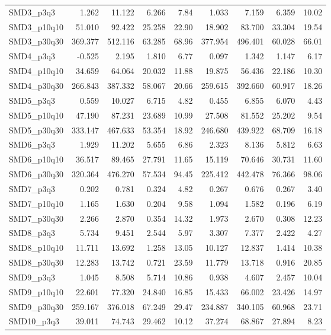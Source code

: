 \begin{longtable}{lrrrrrrrr}
SMD3\_p3q3 & 1.262 & 11.122 & 6.266 & 7.84 & 1.033 & 7.159 & 6.359 & 10.02 \\
SMD3\_p10q10 & 51.010 & 92.422 & 25.258 & 22.90 & 18.902 & 83.700 & 33.304 & 19.54 \\
SMD3\_p30q30 & 369.377 & 512.116 & 63.285 & 68.96 & 377.954 & 496.401 & 60.028 & 66.01 \\
SMD4\_p3q3 & -0.525 & 2.195 & 1.810 & 6.77 & 0.097 & 1.342 & 1.147 & 6.17 \\
SMD4\_p10q10 & 34.659 & 64.064 & 20.032 & 11.88 & 19.875 & 56.436 & 22.186 & 10.30 \\
SMD4\_p30q30 & 266.843 & 387.332 & 58.067 & 20.66 & 259.615 & 392.660 & 60.917 & 18.26 \\
SMD5\_p3q3 & 0.559 & 10.027 & 6.715 & 4.82 & 0.455 & 6.855 & 6.070 & 4.43 \\
SMD5\_p10q10 & 47.190 & 87.231 & 23.689 & 10.99 & 27.508 & 81.552 & 25.202 & 9.54 \\
SMD5\_p30q30 & 333.147 & 467.633 & 53.354 & 18.92 & 246.680 & 439.922 & 68.709 & 16.18 \\
SMD6\_p3q3 & 1.929 & 11.202 & 5.655 & 6.86 & 2.323 & 8.136 & 5.812 & 6.63 \\
SMD6\_p10q10 & 36.517 & 89.465 & 27.791 & 11.65 & 15.119 & 70.646 & 30.731 & 11.60 \\
SMD6\_p30q30 & 320.364 & 476.270 & 57.534 & 94.45 & 225.412 & 442.478 & 76.366 & 98.06 \\
SMD7\_p3q3 & 0.202 & 0.781 & 0.324 & 4.82 & 0.267 & 0.676 & 0.267 & 3.40 \\
SMD7\_p10q10 & 1.165 & 1.630 & 0.204 & 9.58 & 1.094 & 1.582 & 0.196 & 6.19 \\
SMD7\_p30q30 & 2.266 & 2.870 & 0.354 & 14.32 & 1.973 & 2.670 & 0.308 & 12.23 \\
SMD8\_p3q3 & 5.734 & 9.451 & 2.544 & 5.97 & 3.307 & 7.377 & 2.422 & 4.27 \\
SMD8\_p10q10 & 11.711 & 13.692 & 1.258 & 13.05 & 10.127 & 12.837 & 1.414 & 10.38 \\
SMD8\_p30q30 & 12.283 & 13.742 & 0.721 & 23.59 & 11.779 & 13.718 & 0.916 & 20.85 \\
SMD9\_p3q3 & 1.045 & 8.508 & 5.714 & 10.86 & 0.938 & 4.607 & 2.457 & 10.04 \\
SMD9\_p10q10 & 22.601 & 77.320 & 24.840 & 16.85 & 15.433 & 66.002 & 23.426 & 14.97 \\
SMD9\_p30q30 & 259.167 & 376.018 & 67.249 & 29.47 & 234.887 & 340.105 & 60.968 & 23.71 \\
SMD10\_p3q3 & 39.011 & 74.743 & 29.462 & 10.12 & 37.274 & 68.867 & 27.894 & 8.23 \\

\end{longtable}

